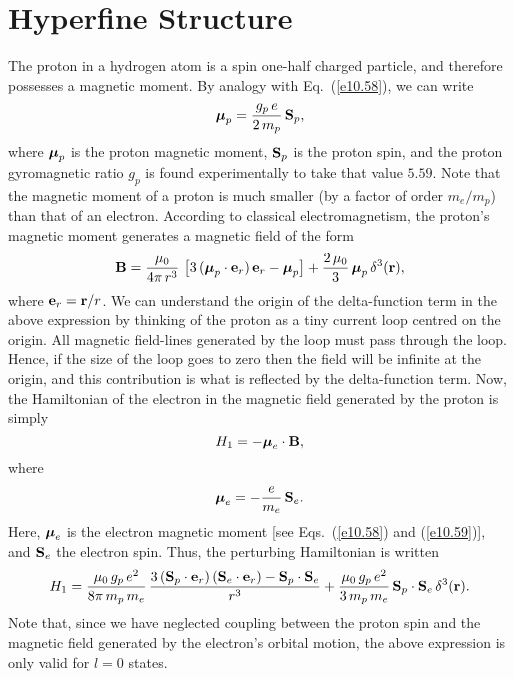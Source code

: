 \section{Hyperfine Structure}
The proton in a hydrogen atom is a spin one-half charged particle, and therefore
possesses a magnetic moment. By analogy with Eq.~(\ref{e10.58}),
we can write
\begin{equation}\label{e12.151}
\mbox{\boldmath$\mu$}_p = \frac{g_p\,e}{2\,m_p}\,{\bf S}_p,
\end{equation}
where $\mbox{\boldmath$\mu$}_p$ is the proton magnetic
moment, ${\bf S}_p$ is the proton spin, and the proton gyromagnetic ratio $g_p$ is found experimentally to take that value $5.59$. Note that the
magnetic moment of a proton is much smaller (by a factor of order $m_e/m_p$)
than that of an electron.
 According
to classical electromagnetism, the proton's magnetic moment generates a
magnetic field of the form
\begin{equation}
{\bf B} = \frac{\mu_0}{4\pi\,r^3}\,\left[3\,(\mbox{\boldmath$\mu$}_p\cdot{\bf e}_r)\,{\bf e}_r - \mbox{\boldmath$\mu$}_p\right] + \frac{2\,\mu_0}{3}\,\mbox{\boldmath$\mu$}_p\,\delta^3({\bf r}),
\end{equation}
where ${\bf e}_r = {\bf r}/r$. We can understand the origin of the delta-function term
in the above expression by thinking of the proton as a tiny current loop centred on the origin.
All magnetic field-lines generated by the loop must pass through the loop.
Hence, if the size of the  loop goes to zero then the field will be infinite at the origin, and this contribution is what is reflected by the delta-function term. Now, the Hamiltonian of the electron in the magnetic
field generated by the proton is simply
\begin{equation}
H_1 = - \mbox{\boldmath$\mu$}_e\cdot {\bf B},
\end{equation}
where
\begin{equation}
\mbox{\boldmath$\mu$}_e = - \frac{e}{m_e}\,{\bf S}_e.
\end{equation}
Here, $\mbox{\boldmath$\mu$}_e$ is the electron  magnetic moment [see Eqs.~(\ref{e10.58})
and (\ref{e10.59})], and ${\bf S}_e$ the electron spin. Thus, the
perturbing Hamiltonian is written
\begin{equation}
H_1=\frac{\mu_0\,g_p\,e^2}{8\pi\,m_p\,m_e}\,
\frac{3\,({\bf S}_p\cdot{\bf e}_r)\,({\bf S}_e\cdot{\bf e}_r) - {\bf S}_p\cdot{\bf S}_e}{r^3} + \frac{\mu_0\,g_p\,e^2}{3\,m_p\,m_e}\,{\bf S}_p\cdot{\bf S}_e\,\delta^3({\bf r}).
\end{equation}
Note that, since we have neglected coupling between the proton
spin and the magnetic field generated by the electron's orbital motion,
the above expression is only valid for $l=0$ states.

